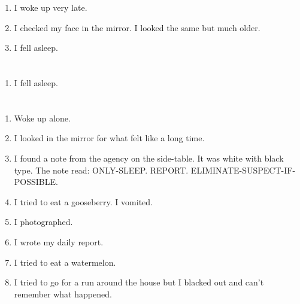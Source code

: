 \documentclass{article}
\begin{document}
    \begin{enumerate}
    
    \item I woke up very late.\\
    
    \item I checked my face in the mirror. I looked the same but much older.\\
    
    \item I fell asleep.\\
    
    \end{enumerate}
     
    \newpage
    
    \section{}
    
    \begin{enumerate}
    
    \item I fell asleep.\\
    
    \end{enumerate}
     
    \newpage
    
    \section{}
    
    \begin{enumerate}
    
    \item Woke up alone.\\
    
    \item I looked in the mirror for what felt like a long time.\\
    
    \item I found a note from the agency on the side-table. It was white with black type. The note read: ONLY-SLEEP. REPORT. ELIMINATE-SUSPECT-IF-POSSIBLE.\\
    
    \item I tried to eat a gooseberry. I vomited.\\
    
    \item I photographed.\\
    
    \item I wrote my daily report.\\
    
    \item I tried to eat a watermelon.\\
    
    \item I tried to go for a run around the house but I blacked out and can't remember what happened.\\
    
    \end{enumerate}
     
\end{document}
